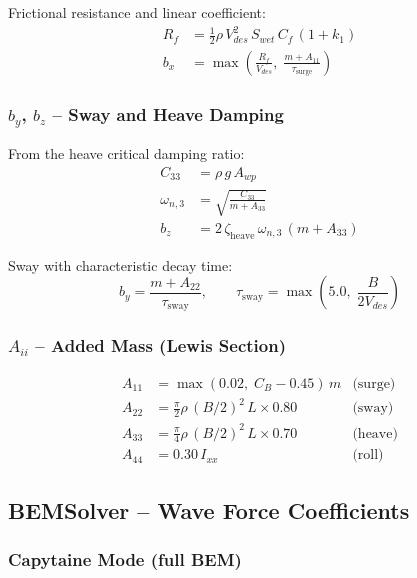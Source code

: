 \documentclass[12pt,a4paper]{article}
\begin{document}
Frictional resistance and linear coefficient:
\begin{align}
  R_f &= \tfrac{1}{2}\rho\,V_{des}^2\,S_{wet}\,C_f\,(1+k_1)
  \label{eq:rf_est}\\[4pt]
  b_x &= \max\!\left(\frac{R_f}{V_{des}},\;\frac{m+A_{11}}{\tau_{\text{surge}}}\right)
  \label{eq:bx_est}
\end{align}

\subsubsection{$b_y$, $b_z$ -- Sway and Heave Damping}

From the heave critical damping ratio:
\begin{align}
  C_{33} &= \rho\,g\,A_{wp}
  \label{eq:c33_e}\\[4pt]
  \omega_{n,3} &= \sqrt{\frac{C_{33}}{m+A_{33}}}
  \label{eq:wn3}\\[4pt]
  b_z &= 2\,\zeta_{\text{heave}}\,\omega_{n,3}\,(m+A_{33})
  \label{eq:bz_e}
\end{align}

Sway with characteristic decay time:
\begin{equation}
  b_y = \frac{m+A_{22}}{\tau_{\text{sway}}},\qquad
  \tau_{\text{sway}} = \max\!\left(5.0,\;\frac{B}{2V_{des}}\right)
  \label{eq:by_e}
\end{equation}

\subsubsection{$A_{ii}$ -- Added Mass (Lewis Section)}

\begin{align}
  A_{11} &= \max(0.02,\;C_B-0.45)\,m
  &\text{(surge)}\\
  A_{22} &= \tfrac{\pi}{2}\rho\,(B/2)^2\,L\times 0.80
  &\text{(sway)}\\
  A_{33} &= \tfrac{\pi}{4}\rho\,(B/2)^2\,L\times 0.70
  &\text{(heave)}\\
  A_{44} &= 0.30\,I_{xx}
  &\text{(roll)}
  \label{eq:am_lewis}
\end{align}

\subsection{BEMSolver -- Wave Force Coefficients}

\subsubsection{Capytaine Mode (full BEM)}
\end{document}
